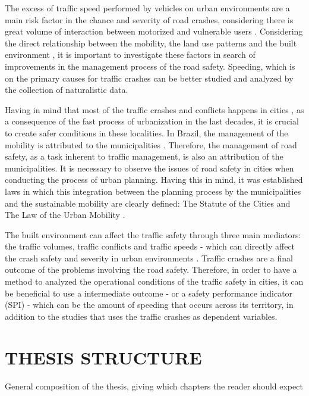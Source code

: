 The excess of traffic speed performed by vehicles on urban environments are a main risk factor in the chance and severity of road crashes, considering there is great volume of interaction between motorized and vulnerable users \cite{Elvik2009}. Considering the direct relationship between the mobility, the land use patterns and the built environment \cite{DeVos2013}, it is important to investigate these factors in search of improvements in the management process of the road safety. Speeding, which is on the primary causes for traffic crashes \cite{WHO2013} can be better studied and analyzed by the collection of naturalistic data.

Having in mind that most of the traffic crashes and conflicts happens in cities \cite{WHO2018}, as a consequence of the fast process of urbanization in the last decades, it is crucial to create safer conditions in these localities. In Brazil, the management of the mobility is attributed to the municipalities \cite{Brasil1997}. Therefore, the management of road safety, as a task inherent to traffic management, is also an attribution of the municipalities. It is necessary to observe the issues of road safety in cities when conducting the process of urban planning. Having this in mind, it was established laws in which this integration between the planning process by the municipalities and the sustainable mobility are clearly defined: The Statute of the Cities \cite{Brasil2001} and The Law of the Urban Mobility \cite{Brasil2012}.    

The built environment can affect the traffic safety through three main mediators: the traffic volumes, traffic conflicts and traffic speeds - which can directly affect the crash safety and severity in urban environments \cite{Ewing2009}. Traffic crashes are a final outcome of the problems involving the road safety. Therefore, in order to have a method to analyzed the operational conditions of the traffic safety in cities, it can be beneficial to use a intermediate outcome - or a safety performance indicator (SPI) \cite{Bastos2014} - which can be the amount of speeding that occurs across its territory, in addition to the studies that uses the traffic crashes as dependent variables. 

\section{THESIS STRUCTURE}

General composition of the thesis, giving which chapters the reader should expect

